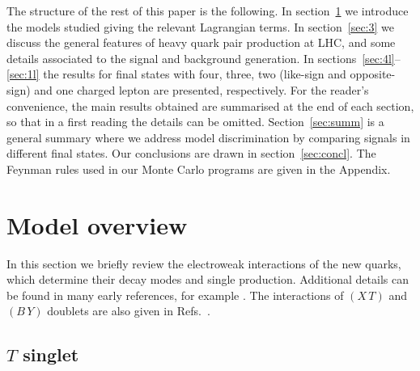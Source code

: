 \documentclass[12pt,a4paper]{article}
\newcommand{\XT}{(X \, T)}
\newcommand{\BY}{(B \, Y)}
\begin{document}
The structure of the rest of this paper is the following. In section~\ref{sec:2} we introduce the models studied giving the relevant Lagrangian terms. In section~\ref{sec:3} we discuss the general features of heavy quark pair production at LHC, and some details associated to the signal and background generation. In sections~\ref{sec:4l}--\ref{sec:1l} the results for final states with four, three, two (like-sign and opposite-sign) and one charged lepton are presented, respectively. For the reader's convenience, the main results obtained  are summarised at the end of each section, so that in a first reading the details can be omitted. Section~\ref{sec:summ} is a general summary where we address model discrimination by comparing signals in different final states. Our conclusions are drawn in section~\ref{sec:concl}. The Feynman rules used in our Monte Carlo programs are given in the Appendix.

\section{Model overview}
\label{sec:2}

In this section we briefly review the electroweak interactions of the new quarks, which determine their decay modes and single production. Additional details can be found in many early references, for example
\cite{delAguila:1982fs,delAguila:1989rq,
Branco:1986my}.
The interactions of $\XT$ and $\BY$ doublets are also given in Refs.~\cite{delAguila:2000aa,delAguila:2000rc}.


\subsection{$T$ singlet}
\label{sec:2.1}
\end{document}

